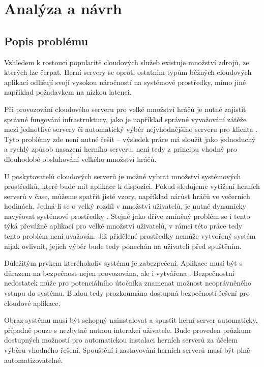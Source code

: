\chapter[Analýza a návrh]{Analýza a návrh}

\section{Popis problému}

Vzhledem k rostoucí popularitě cloudových služeb \cite{statista_cloud_revenue} existuje množství zdrojů, ze kterých lze čerpat.
Herní servery se oproti ostatním typům běžných cloudových aplikací odlišují svojí vysokou náročností
na systémové prostředky, mimo jiné například požadavkem na nízkou latenci.

Při provozování cloudového serveru pro velké množství hráčů je nutné zajistit správné fungování infrastruktury,
jako je například správné vyvažování zátěže mezi jednotlivé servery či automatický výběr nejvhodnějšího serveru
pro klienta \cite{building_cloud_mog_server}. Tyto problémy zde není nutné řešit -- výsledek práce má sloužit jako jednoduchý a rychlý
způsob nasazení herního serveru, není tedy z principu vhodný pro dlouhodobé obsluhování velkého množství hráčů.

U poskytovatelů cloudových serverů je možné vybrat množství systémových prostředků, které bude mít aplikace k dispozici.
Pokud sledujeme vytížení herních serverů v čase, můžeme spatřit jisté vzory, například nárůst hráčů ve večerních hodinách.
Jedná-li se o velký rozdíl v množství uživatelů, je nutné dynamicky navyšovat systémové prostředky \cite{efficient_resources}.
Stejně jako dříve zmíněný problém se i tento týká převážně aplikací pro velké množství uživatelů, v rámci této práce tedy tento problém není uvažován.
Již přidělené prostředky nemůže vytvořený systém nijak ovlivnit, jejich výběr bude tedy ponechán na uživateli před spuštěním.

Důležitým prvkem kteréhokoliv systému je zabezpečení. Aplikace musí být s důrazem na bezpečnost nejen provozována,
ale i vytvářena \cite{newcombe_2012}. Bezpečnostní nedostatek může pro potenciálního útočníka znamenat možnost neoprávněného vstupu do systému.
Budou tedy prozkoumána dostupná bezpečností řešení pro cloudové aplikace.

Obraz systému musí být schopný nainstalovat a spustit herní server automaticky, případně pouze s nezbytně nutnou interakcí uživatele.
Bude proveden průzkum dostupných možností pro automatickou instalaci herních serverů za účelem výběru vhodného řešení.
Spouštění i zastavování herních serverů musí být plně automatizovatelné.

